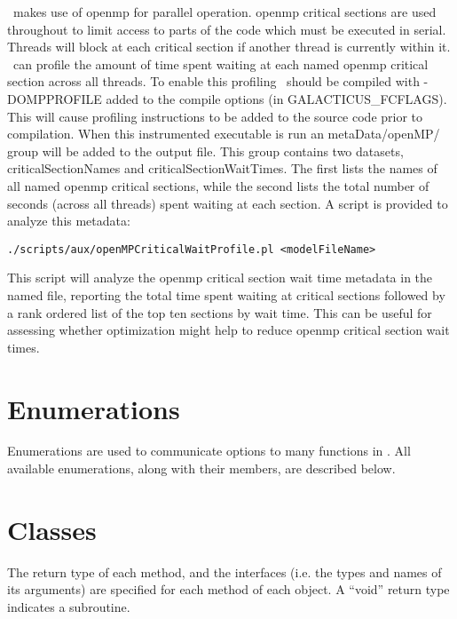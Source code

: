\glc\ makes use of \gls{openmp} for parallel operation. \gls{openmp} {\normalfont \ttfamily critical} sections are used throughout to limit access to parts of the code which must be executed in serial. Threads will block at each {\normalfont \ttfamily critical} section if another thread is currently within it. \glc\ can profile the amount of time spent waiting at each named \gls{openmp} {\normalfont \ttfamily critical} section across all threads. To enable this profiling \glc\ should be compiled with {\normalfont \ttfamily -DOMPPROFILE} added to the compile options (in {\normalfont \ttfamily GALACTICUS\_FCFLAGS}). This will cause profiling instructions to be added to the source code prior to compilation. When this instrumented executable is run an {\normalfont \ttfamily metaData/openMP/} group will be added to the output file. This group contains two datasets, {\normalfont \ttfamily criticalSectionNames} and {\normalfont \ttfamily criticalSectionWaitTimes}. The first lists the names of all named \gls{openmp} {\normalfont \ttfamily critical} sections, while the second lists the total number of seconds (across all threads) spent waiting at each section. A script is provided to analyze this metadata:
\begin{verbatim}
./scripts/aux/openMPCriticalWaitProfile.pl <modelFileName>
\end{verbatim}
This script will analyze the \gls{openmp} {\normalfont \ttfamily critical} section wait time metadata in the named file, reporting the total time spent waiting at critical sections followed by a rank ordered list of the top ten sections by wait time. This can be useful for assessing whether optimization might help to reduce \gls{openmp} {\normalfont \ttfamily critical} section wait times.

\section{Enumerations}

Enumerations are used to communicate options to many functions in \glc. All available enumerations, along with their members, are described below.



\section{Classes}
 
The return type of each method, and the interfaces (i.e. the types and names of its arguments) are specified for each method of each object. A ``{\normalfont \ttfamily void}'' return type indicates a subroutine.

